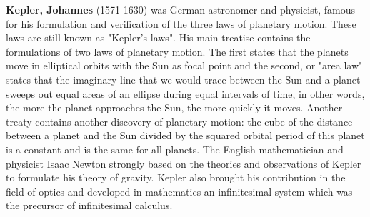 {}
\label{sec:K}

\textbf{Kepler, Johannes} (1571-1630) was German astronomer and physicist, famous for his formulation and verification of the three laws of planetary motion. These laws are still known as "Kepler's laws". His main treatise contains the formulations of two laws of planetary motion. The first states that the planets move in elliptical orbits with the Sun as focal point and the second, or "area law" states that the imaginary line that we would trace between the Sun and a planet sweeps out equal areas of an ellipse during equal intervals of time, in other words, the more the planet approaches the Sun, the more quickly it moves. Another treaty contains another discovery of planetary motion: the cube of the distance between a planet and the Sun divided by the squared orbital period of this planet is a constant and is the same for all planets. The English mathematician and physicist Isaac Newton strongly based on the theories and observations of Kepler to formulate his theory of gravity. Kepler also brought his contribution in the field of optics and developed in mathematics an infinitesimal system which was the precursor of infinitesimal calculus.

